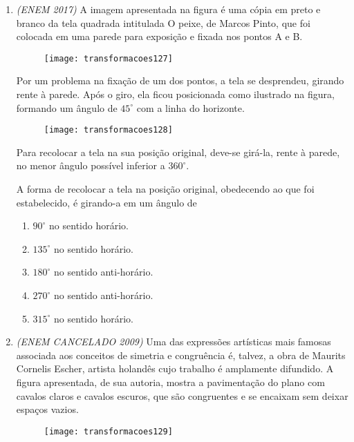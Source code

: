 \begin{enumerate}
\item \textit{(ENEM 2017)} A imagem apresentada na figura é uma cópia em preto e branco da tela quadrada intitulada O peixe, de Marcos Pinto, que foi colocada em uma parede para exposição e fixada nos pontos A e B.
\begin{figure}[H]
\centering

\texttt{[image: transformacoes127]}
\end{figure}

Por um problema na fixação de um dos pontos, a tela se desprendeu, girando rente à parede. Após o giro, ela ficou posicionada como ilustrado na figura, formando um ângulo de $45^{\circ}$ com a linha do horizonte.

\begin{figure}[H]
\centering

\texttt{[image: transformacoes128]}
\end{figure}

Para recolocar a tela na sua posição original, deve-se girá-la, rente à parede, no menor ângulo possível inferior a $360^{\circ}$.

A forma de recolocar a tela na posição original, obedecendo ao que foi estabelecido, é girando-a em um ângulo de
\begin{enumerate}
\item $90^{\circ}$ no sentido horário.
\item $135^{\circ}$ no sentido horário.
\item $180^{\circ}$ no sentido anti-horário.
\item $270^{\circ}$ no sentido anti-horário.
\item $315^{\circ}$ no sentido horário.
\end{enumerate}

\item \textit{(ENEM CANCELADO 2009)} Uma das expressões artísticas mais famosas associada aos conceitos de simetria e congruência é, talvez, a obra de Maurits Cornelis Escher, artista holandês cujo trabalho é amplamente difundido. A figura apresentada, de sua autoria, mostra a pavimentação do plano com cavalos claros e cavalos escuros, que são congruentes e se encaixam sem deixar espaços vazios.

\begin{figure}[H]
\centering

\texttt{[image: transformacoes129]}
\end{figure}


\end{enumerate}
